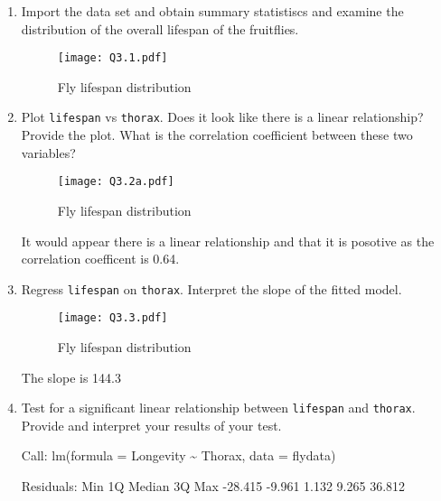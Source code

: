 \documentclass[12pt,letterpaper]{article}
\begin{document}
\begin{enumerate}
	
	\item
	Import the data set and obtain summary statistiscs and examine the distribution of the overall lifespan of the fruitflies.  


\begin{figure}[htbp]
	\centerline{\texttt{[image: Q3.1.pdf]}}
	\caption{Fly lifespan distribution}
	\label{fig}
\end{figure}

\newpage
	\item
	Plot \texttt{lifespan} vs \texttt{thorax}. Does it look like there is a linear relationship? Provide the plot. What is the correlation coefficient between these two variables?
		\vspace{6cm}
		
\begin{figure}[htbp]
	\centerline{\texttt{[image: Q3.2a.pdf]}}
	\caption{Fly lifespan distribution}
	\label{fig}
\end{figure}



It would appear there is a linear relationship and that it is posotive as the correlation coefficent is 0.64.

	\item
	Regress \texttt{lifespan} on \texttt{thorax}.  Interpret the slope of the fitted model.
			\vspace{6cm}
			


\begin{figure}[htbp]
	\centerline{\texttt{[image: Q3.3.pdf]}}
	\caption{Fly lifespan distribution}
	\label{fig}
\end{figure}
	
	The slope is 144.3

	\item
	Test for a significant linear relationship between  \texttt{lifespan} and \texttt{thorax}. Provide and interpret your results of your test.

	

Call:
lm(formula = Longevity \~{} Thorax, data = flydata)

Residuals:
Min      1Q  Median      3Q     Max 
-28.415  -9.961   1.132   9.265  36.812 


\end{enumerate}
\end{document}
